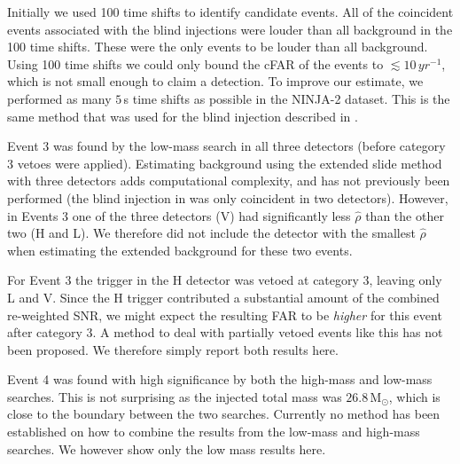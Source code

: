 Initially we used 100 time shifts to identify candidate events. All of the
coincident events associated with the blind injections were louder than
all background in the 100 time shifts. These were the only events to be
louder than all background. Using 100 time shifts we could only bound the cFAR
of the events to $\lesssim 10\,yr^{-1}$, which is not small enough to claim a
detection. To improve our estimate, we performed as many $5\,$s time shifts as
possible in the NINJA-2 dataset. This is the same
method that was used for the blind injection described in
\cite{Colaboration:2011np}. 

Event $3$ was found by the low-mass search in all three detectors
(before category 3 vetoes
were applied).  Estimating background using the extended slide method with
three detectors adds computational complexity, and has not previously been
performed (the blind injection in \cite{Colaboration:2011np} was only
coincident in two detectors). However, in Events 3 one of the three
detectors (V) had significantly less $\hat{\rho}$ than the other two (H and L).
We therefore did not include the detector with the smallest
$\hat{\rho}$ when estimating the extended background for these two events. 

For Event 3 the trigger in the H detector was vetoed at
category 3, leaving only L and V. Since the H trigger contributed a substantial
amount of the combined re-weighted SNR, we might expect the resulting FAR to be 
\emph{higher} for this event after category 3. A method to deal 
with partially vetoed events like this has not been proposed. We therefore 
simply report both results here.

Event 4 was found with high significance by both the high-mass and low-mass
searches. This is not surprising as the injected total mass was
$26.8\,\mathrm{M}_\odot$, which is close to the boundary between the two
searches. Currently no method has been established on how to combine the
results from the low-mass and high-mass searches. 
We however show only the low mass results here.

